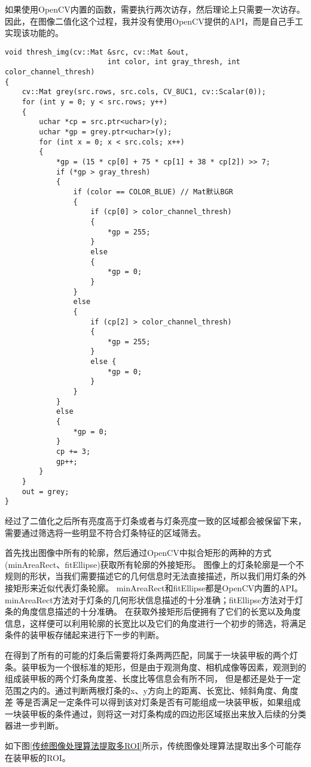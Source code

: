 如果使用OpenCV内置的函数，需要执行两次访存，然后理论上只需要一次访存。因此，在图像二值化这个过程，我并没有使用OpenCV提供的API，而是自己手工实现该功能的。
\begin{lstlisting}
void thresh_img(cv::Mat &src, cv::Mat &out, 
                        int color, int gray_thresh, int color_channel_thresh)
{
    cv::Mat grey(src.rows, src.cols, CV_8UC1, cv::Scalar(0));
    for (int y = 0; y < src.rows; y++)
    {
        uchar *cp = src.ptr<uchar>(y);
        uchar *gp = grey.ptr<uchar>(y);
        for (int x = 0; x < src.cols; x++)
        {
            *gp = (15 * cp[0] + 75 * cp[1] + 38 * cp[2]) >> 7;
            if (*gp > gray_thresh) 
            {
                if (color == COLOR_BLUE) // Mat默认BGR
                {
                    if (cp[0] > color_channel_thresh)
                    {
                        *gp = 255;
                    }
                    else 
                    {
                        *gp = 0;
                    }
                } 
                else 
                {
                    if (cp[2] > color_channel_thresh)
                    {
                        *gp = 255;
                    }
                    else {
                        *gp = 0;
                    }
                } 
            }
            else
            {
                *gp = 0;
            }
            cp += 3;
            gp++;
        } 
    }
    out = grey;
}
\end{lstlisting}


经过了二值化之后所有亮度高于灯条或者与灯条亮度一致的区域都会被保留下来，需要通过筛选将一些明显不符合灯条特征的区域筛去。\par

首先找出图像中所有的轮廓，然后通过OpenCV中拟合矩形的两种的方式(minAreaRect、fitEllipse)获取所有轮廓的外接矩形。
图像上的灯条轮廓是一个不规则的形状，当我们需要描述它的几何信息时无法直接描述，所以我们用灯条的外接矩形来近似代表灯条轮廓。
minAreaRect和fitEllipse都是OpenCV内置的API。minAreaRect方法对于灯条的几何形状信息描述的十分准确；fitEllipse方法对于灯条的角度信息描述的十分准确。
在获取外接矩形后便拥有了它们的长宽以及角度信息，这样便可以利用轮廓的长宽比以及它们的角度进行一个初步的筛选，将满足条件的装甲板存储起来进行下一步的判断。\par


在得到了所有的可能的灯条后需要将灯条两两匹配，同属于一块装甲板的两个灯条。装甲板为一个很标准的矩形，但是由于观测角度、相机成像等因素，观测到的组成装甲板的两个灯条角度差、长度比等信息会有所不同，
但是都还是处于一定范围之内的。通过判断两根灯条的x、y方向上的距离、长宽比、倾斜角度、角度差
等是否满足一定条件可以得到该对灯条是否有可能组成一块装甲板，如果组成一块装甲板的条件通过，则将这一对灯条构成的四边形区域抠出来放入后续的分类器进一步判断。\par
如下图\ref{传统图像处理算法提取多ROI}所示，传统图像处理算法提取出多个可能存在装甲板的ROI。

